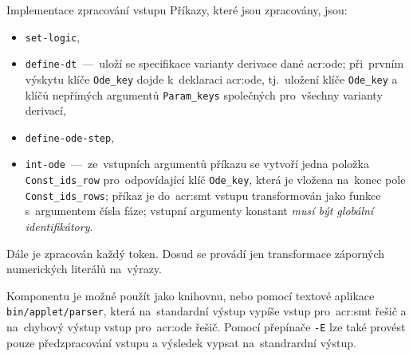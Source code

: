 \documentclass[thesis=M,czech]{FITthesis}[2012/06/26]
\newcommand{\acrlabel}[1]{acr:#1}
\newcommand{\acr}[1]{\acrshort{\acrlabel{#1}}}
\newcommand{\id}[1]{\texttt{#1}}
\newcommand{\hl}[1]{\textit{#1}}
\newcommand{\binDir}{\id{bin}}
\newcommand{\appletDir}{\id{\binDir{}/\-applet}}
\newcommand{\appletFn}[1]{\id{\appletDir{}/\-#1}}
\begin{document}
\begin{section}{Implementace zpracování vstupu}
Příkazy, které jsou zpracovány, jsou:
\begin{itemize}
\item \id{set\--logic},
\item \id{define\--dt}~---~uloží se specifikace varianty
   derivace dané \acr{ode}; při~prvním výskytu
   klíče \id{Ode\_\-key} dojde k~deklaraci \acr{ode},
   tj.~uložení klíče \id{Ode\_\-key}
   a klíčů nepřímých argumentů \id{Param\_\-keys}
   společných pro~všechny varianty derivací,
\item \id{define\--ode\--step},
\item \id{int\--ode}~---~ze~vstupních argumentů příkazu
   se vytvoří jedna položka \id{Const\_\-ids\_\-row}
   pro~odpovídající klíč \id{Ode\_\-key},
   která je vložena na~konec pole \id{Const\_\-ids\_\-rows};
   příkaz je do~\acr{smt} vstupu transformován jako
   funkce s~argumentem čísla fáze;
   vstupní argumenty konstant \hl{musí být globální identifikátory}.
\end{itemize}

Dále je zpracován každý token.
Dosud se provádí jen transformace
záporných numerických literálů na~výrazy.

Komponentu je možné použít jako knihovnu,
nebo pomocí textové aplikace \appletFn{parser},
která na~standardní výstup vypíše
vstup pro~\acr{smt} řešič
a na~chybový výstup
vstup pro~\acr{ode} řešič.
Pomocí přepínače \id{-E}
lze také provést pouze předzpracování vstupu
a výsledek vypsat na~standrardní výstup.
\end{section} %

\end{document}
